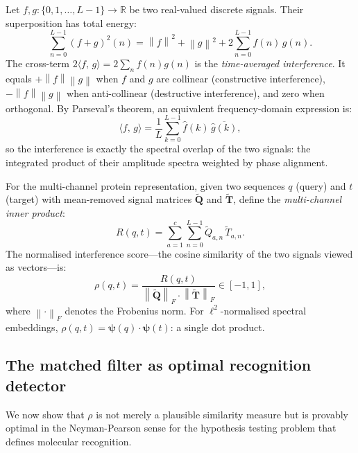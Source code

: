 \documentclass[twocolumn,11pt,a4paper]{article}
\theoremstyle{definition}
\theoremstyle{remark}
\newcommand{\RR}{\mathbb{R}}
\newcommand{\innerprod}[2]{\langle #1,\, #2 \rangle}
\newcommand{\norm}[1]{\left\| #1 \right\|}
\begin{document}
Let $f, g: \{0,1,\ldots,L-1\} \to \RR$ be two real-valued discrete signals.
Their superposition has total energy:
\begin{equation}
  \sum_{n=0}^{L-1}(f+g)^2(n)
  = \norm{f}^2 + \norm{g}^2
    + 2\sum_{n=0}^{L-1} f(n)\,g(n).
  \label{eq:superposition}
\end{equation}
The cross-term $2\innerprod{f}{g} = 2\sum_n f(n)g(n)$ is the
\emph{time-averaged interference}. It equals $+\norm{f}\norm{g}$ when $f$
and $g$ are collinear (constructive interference),
$-\norm{f}\norm{g}$ when anti-collinear (destructive interference),
and zero when orthogonal. By Parseval's theorem, an equivalent frequency-domain
expression is:
\begin{equation}
  \innerprod{f}{g}
  = \frac{1}{L}\sum_{k=0}^{L-1}\widehat{f}(k)\,\overline{\widehat{g}(k)},
  \label{eq:parseval_innerprod}
\end{equation}
so the interference is exactly the spectral overlap of the two signals: the
integrated product of their amplitude spectra weighted by phase alignment.

For the multi-channel protein representation, given two sequences $q$ (query)
and $t$ (target) with mean-removed signal matrices $\widetilde{\mathbf{Q}}$
and $\widetilde{\mathbf{T}}$, define the \emph{multi-channel inner product}:
\begin{equation}
  R(q,t) = \sum_{a=1}^{c} \sum_{n=0}^{L-1}
    \widetilde{Q}_{a,n}\,\widetilde{T}_{a,n}.
  \label{eq:multichannel_ip}
\end{equation}
The normalised interference score---the cosine similarity of the two signals
viewed as vectors---is:
\begin{equation}
  \rho(q,t)
  = \frac{R(q,t)}
         {\norm{\widetilde{\mathbf{Q}}}_F \cdot \norm{\widetilde{\mathbf{T}}}_F}
  \in [-1,1],
  \label{eq:rho}
\end{equation}
where $\norm{\cdot}_F$ denotes the Frobenius norm. For $\ell^2$-normalised
spectral embeddings, $\rho(q,t) = \bm{\psi}(q)\cdot\bm{\psi}(t)$: a single
dot product.

\subsection{The matched filter as optimal recognition detector}
\label{sec:matched_filter}

We now show that $\rho$ is not merely a plausible similarity measure but is
provably optimal in the Neyman-Pearson sense for the hypothesis testing
problem that defines molecular recognition.
\end{document}
